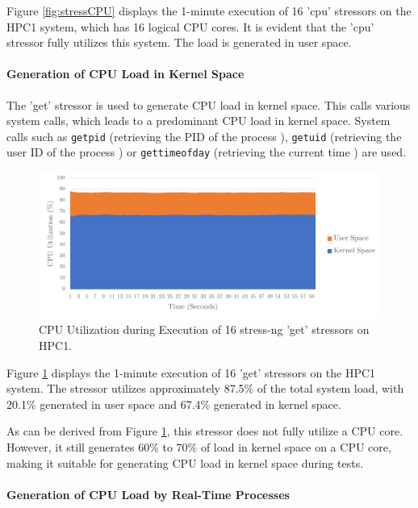 Figure \ref{fig:stressCPU} displays the 1-minute execution of 16 'cpu' stressors on the HPC1 system, which has 16 logical CPU cores. It is evident that the 'cpu' stressor fully utilizes this system. The load is generated in user space.

\paragraph{Generation of CPU Load in Kernel Space}
The 'get' stressor is used to generate CPU load in kernel space. This calls various system calls, which leads to a predominant CPU load in kernel space. System calls such as \texttt{getpid} (retrieving the PID of the process \cite{stress06}), \texttt{getuid} (retrieving the user ID of the process \cite{stress07}) or \texttt{gettimeofday} (retrieving the current time \cite{stress08}) are used.

\begin{figure}[h!]
    \centering
    \includegraphics[width=1\linewidth]{figures/method/stress2.pdf}
    \caption{CPU Utilization during Execution of 16 stress-ng 'get' stressors on HPC1.}
    \label{fig:stressGET}
\end{figure}

Figure \ref{fig:stressGET} displays the 1-minute execution of 16 'get' stressors on the HPC1 system. The stressor utilizes approximately 87.5\% of the total system load, with 20.1\% generated in user space and 67.4\% generated in kernel space.

As can be derived from Figure \ref{fig:stressGET}, this stressor does not fully utilize a CPU core. However, it still generates 60\% to 70\% of load in kernel space on a CPU core, making it suitable for generating CPU load in kernel space during tests.

\paragraph{Generation of CPU Load by Real-Time Processes}


